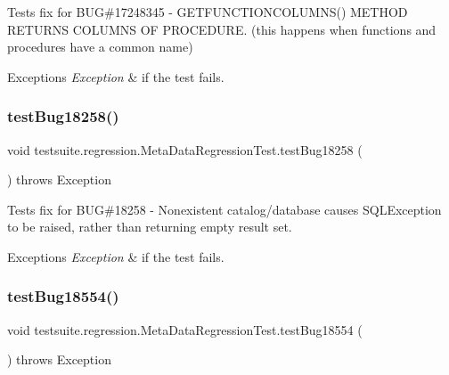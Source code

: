 Tests fix for B\+UG\#17248345 -\/ G\+E\+T\+F\+U\+N\+C\+T\+I\+O\+N\+C\+O\+L\+U\+M\+N\+S() M\+E\+T\+H\+OD R\+E\+T\+U\+R\+NS C\+O\+L\+U\+M\+NS OF P\+R\+O\+C\+E\+D\+U\+RE. (this happens when functions and procedures have a common name)


\begin{DoxyExceptions}{Exceptions}
{\em Exception} & if the test fails. \\
\hline
\end{DoxyExceptions}
\mbox{\label{classtestsuite_1_1regression_1_1_meta_data_regression_test_af1076e63dffd2b6792697be0f509d039}} 
\subsubsection{\texorpdfstring{test\+Bug18258()}{testBug18258()}}
{\footnotesize\ttfamily void testsuite.\+regression.\+Meta\+Data\+Regression\+Test.\+test\+Bug18258 (\begin{DoxyParamCaption}{ }\end{DoxyParamCaption}) throws Exception}

Tests fix for B\+UG\#18258 -\/ Nonexistent catalog/database causes S\+Q\+L\+Exception to be raised, rather than returning empty result set.


\begin{DoxyExceptions}{Exceptions}
{\em Exception} & if the test fails. \\
\hline
\end{DoxyExceptions}
\mbox{\label{classtestsuite_1_1regression_1_1_meta_data_regression_test_ac00a7a14db2a9fd6e4c1439959c0a67d}} 
\subsubsection{\texorpdfstring{test\+Bug18554()}{testBug18554()}}
{\footnotesize\ttfamily void testsuite.\+regression.\+Meta\+Data\+Regression\+Test.\+test\+Bug18554 (\begin{DoxyParamCaption}{ }\end{DoxyParamCaption}) throws Exception}

